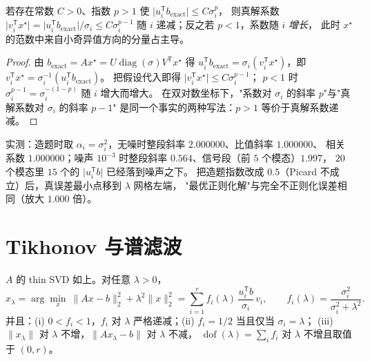 \begin{theorem}
\label{thm:picard}
若存在常数 $C>0$、指数 $p>1$ 使 $\lvert u_i^{\mathsf T}b_{\text{exact}}\rvert\le C\sigma_i^{p}$，
则真解系数 $\lvert v_i^{\mathsf T}x^\star\rvert=\lvert u_i^{\mathsf T}b_{\text{exact}}\rvert/\sigma_i
\le C\sigma_i^{p-1}$ 随 $i$ 递减；反之若 $p<1$，系数随 $i$ \emph{增长}，
此时 $x^\star$ 的范数中来自小奇异值方向的分量占主导。
\end{theorem}

\begin{proof}
由 $b_{\text{exact}}=Ax^\star=U\operatorname{diag}(\sigma)V^{\mathsf T}x^\star$ 得
$u_i^{\mathsf T}b_{\text{exact}}=\sigma_i(v_i^{\mathsf T}x^\star)$，即
$v_i^{\mathsf T}x^\star=\sigma_i^{-1}(u_i^{\mathsf T}b_{\text{exact}})$。
把假设代入即得 $\lvert v_i^{\mathsf T}x^\star\rvert\le C\sigma_i^{p-1}$；
$p<1$ 时 $\sigma_i^{p-1}=\sigma_i^{-(1-p)}$ 随 $i$ 增大而增大。
在双对数坐标下，"系数对 $\sigma_i$ 的斜率 $p$"与"真解系数对 $\sigma_i$ 的斜率 $p-1$"
是同一个事实的两种写法：$p>1$ 等价于真解系数递减。
\end{proof}

实测：造题时取 $\alpha_i=\sigma_i^{2}$，无噪时整段斜率 $2.000000$、比值斜率 $1.000000$、
相关系数 $1.000000$；噪声 $10^{-3}$ 时整段斜率 $0.564$、信号段（前 $5$ 个模态）$1.997$，
$20$ 个模态里 $15$ 个的 $\lvert u_i^{\mathsf T}b\rvert$ 已经落到噪声之下。
把造题指数改成 $0.5$（Picard 不成立）后，真误差最小点移到 $\lambda$ 网格左端，
"最优正则化解"与完全不正则化误差相同（放大 $1.000$ 倍）。

\section{Tikhonov 与谱滤波}

\begin{theorem}
\label{thm:tikhonov}
$A$ 的 thin SVD 如上。对任意 $\lambda>0$，
\[
  x_\lambda=\arg\min_x\ \lVert Ax-b\rVert_2^2+\lambda^2\lVert x\rVert_2^2
  =\sum_{i=1}^{r} f_i(\lambda)\,\frac{u_i^{\mathsf T}b}{\sigma_i}\,v_i,
  \qquad f_i(\lambda)=\frac{\sigma_i^{2}}{\sigma_i^{2}+\lambda^{2}} .
\]
并且：(i) $0<f_i<1$，$f_i$ 对 $\lambda$ 严格递减；(ii) $f_i=1/2$ 当且仅当 $\sigma_i=\lambda$；
(iii) $\lVert x_\lambda\rVert$ 对 $\lambda$ 不增，$\lVert Ax_\lambda-b\rVert$ 对 $\lambda$ 不减，
$\operatorname{dof}(\lambda)=\sum_if_i$ 对 $\lambda$ 不增且取值于 $(0,r)$。
\end{theorem}

